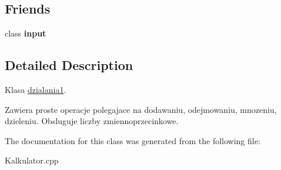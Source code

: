 \subsection*{Friends}
\begin{DoxyCompactItemize}
\item 
\hypertarget{classdzialania1_a0a8814941837a9542fbb768e740fd03b}{class {\bfseries input}}\label{classdzialania1_a0a8814941837a9542fbb768e740fd03b}

\end{DoxyCompactItemize}


\subsection{Detailed Description}
Klasa \hyperlink{classdzialania1}{dzialania1}. 

Zawiera proste operacje polegajace na dodawaniu, odejmowaniu, mnozeniu, dzieleniu. Obsluguje liczby zmiennoprzecinkowe. 

The documentation for this class was generated from the following file\+:\begin{DoxyCompactItemize}
\item 
Kalkulator.\+cpp\end{DoxyCompactItemize}

